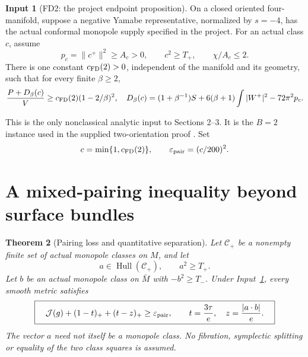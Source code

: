 \documentclass[11pt,a4paper]{article}
\newtheorem{theorem}{Theorem}[section]
\theoremstyle{definition}\newtheorem{assumption}[theorem]{Input}
\theoremstyle{remark}\newtheorem{remark}[theorem]{Remark}
\newcommand{\Hull}{\operatorname{Hull}}
\newcommand{\cJ}{\mathcal J}
\numberwithin{equation}{section}
\begin{document}
\begin{assumption}[FD2: the project endpoint proposition]\label{fd}
On a closed oriented four-manifold, suppose a negative Yamabe representative, normalized by $s=-4$, has the actual conformal monopole supply specified in the project. For an actual class $c$, assume
\[
 p_c=\|c^+\|^2\ge A_c>0,\qquad c^2\ge T_+,\qquad \chi/A_c\le2.
\]
There is one constant $c_{\rm FD}(2)>0$, independent of the manifold and its geometry, such that for every finite $\beta\ge2$,
\begin{equation}\label{fd-est}
 \frac{P+D_\beta(c)}{V}\ge c_{\rm FD}(2)(1-2/\beta)^2,
\quad
 D_\beta(c)=(1+\beta^{-1})S+6(\beta+1)\int|W^+|^2-72\pi^2p_c.
\end{equation}
\end{assumption}
This is the only nonclassical analytic input to Sections 2--3. It is the $B=2$ instance used in the supplied two-orientation proof \cite{ProjectFD,ProjectPair}. Set
\begin{equation}\label{eps}
 c=\min\{1,c_{\rm FD}(2)\},\qquad \varepsilon_{\rm pair}=(c/200)^2.
\end{equation}

\section{A mixed-pairing inequality beyond surface bundles}
\begin{theorem}[Pairing loss and quantitative separation]\label{pair}
Let $\mathcal C_+$ be a nonempty finite set of actual monopole classes on $M$, and let
\[
 a\in\Hull(\mathcal C_+),\qquad a^2\ge T_+.
\]
Let $b$ be an actual monopole class on $\bar M$ with $-b^2\ge T_-$. Under Input~\ref{fd}, every smooth metric satisfies
\begin{equation}\label{pair-est}
\boxed{\quad
\cJ(g)+(1-t)_++(t-z)_+\ge\varepsilon_{\rm pair},\qquad
 t=\frac{3\tau}{e},\quad z=\frac{|a\cdot b|}{e}.
\quad}
\end{equation}
The vector $a$ need not itself be a monopole class. No fibration, symplectic splitting or equality of the two class squares is assumed.
\end{theorem}
\end{document}
